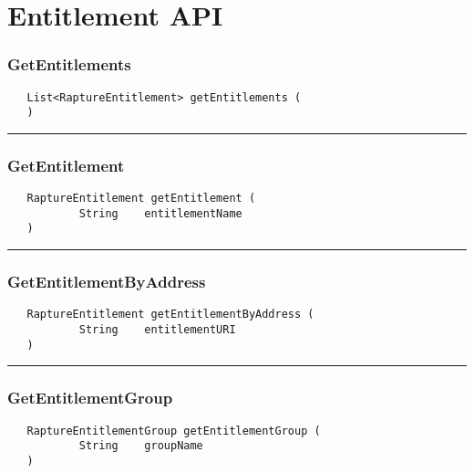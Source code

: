 \chapter{Entitlement API}

\subsection{GetEntitlements}
\label{Api:GetEntitlements}
\begin{verbatim}
   List<RaptureEntitlement> getEntitlements (
   )
\end{verbatim}



\rule{15cm}{2pt}
\subsection{GetEntitlement}
\label{Api:GetEntitlement}
\begin{verbatim}
   RaptureEntitlement getEntitlement (
           String    entitlementName
   )
\end{verbatim}



\rule{15cm}{2pt}
\subsection{GetEntitlementByAddress}
\label{Api:GetEntitlementByAddress}
\begin{verbatim}
   RaptureEntitlement getEntitlementByAddress (
           String    entitlementURI
   )
\end{verbatim}



\rule{15cm}{2pt}
\subsection{GetEntitlementGroup}
\label{Api:GetEntitlementGroup}
\begin{verbatim}
   RaptureEntitlementGroup getEntitlementGroup (
           String    groupName
   )
\end{verbatim}



